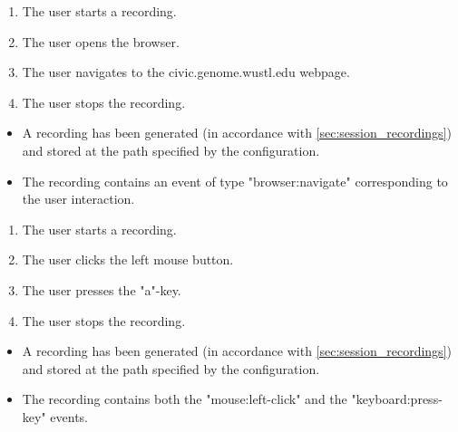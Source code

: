 \begin{tests}
    {\begin{enumerate}
        \item The \gls{user} starts a recording.
        \item The \gls{user} opens the browser.
        \item The \gls{user} navigates to the civic.genome.wustl.edu webpage.
        \item The \gls{user} stops the recording.
    \end{enumerate}}
    {\begin{itemize}
        \item A recording has been generated (in accordance with \ref{sec:session_recordings}) and stored at the path specified by the configuration.
        \item The recording contains an \gls{event} of type "browser:navigate" corresponding to the user interaction.
    \end{itemize}}

    {\begin{enumerate}
        \item The \gls{user} starts a recording.
        \item The \gls{user} clicks the left mouse button.
        \item The \gls{user} presses the "a"-key.
        \item The \gls{user} stops the recording.
    \end{enumerate}}
    {\begin{itemize}
        \item A recording has been generated (in accordance with \ref{sec:session_recordings}) and stored at the path specified by the configuration.
        \item The recording contains both the "mouse:left-click" and the "keyboard:press-key" events.
    \end{itemize}}


\end{tests}
